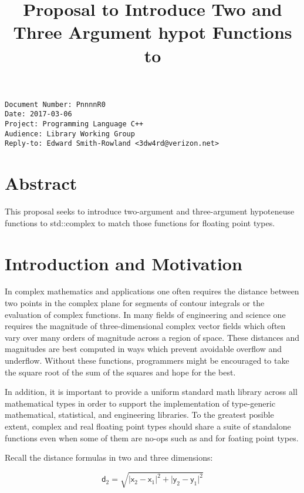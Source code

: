 \documentclass[ebook,10pt,oneside,openany,final]{memoir}
\title{Proposal to Introduce Two and Three Argument hypot Functions to \tcode{<complex>}}
\date{}
\begin{document}
\pagestyle{cpppage}

\maketitle

\begin{verbatim}
Document Number: PnnnnR0
Date: 2017-03-06
Project: Programming Language C++
Audience: Library Working Group
Reply-to: Edward Smith-Rowland <3dw4rd@verizon.net>
\end{verbatim}

\section{Abstract}

This proposal seeks to introduce two-argument and three-argument hypoteneuse functions
to std::complex to match those functions for floating point types.

\section{Introduction and Motivation}

In complex mathematics and applications one often requires the distance between two points in the complex plane
for segments of contour integrals or the evaluation of complex functions.  In many fields of engineering and science
one requires the magnitude of three-dimensional complex vector fields which often vary over many orders of magnitude across
a region of space.  These distances and magnitudes are best computed in ways which prevent avoidable overflow and underflow.
Without these functions, programmers might be encouraged to take the square root of the sum of the squares and hope
for the best.

In addition, it is important to provide a uniform standard math library across all mathematical types in order to support
the implementation of type-generic mathematical, statistical, and engineering libraries.  To the greatest posible extent,
complex and real floating point types should share a suite of standalone functions even when some of them are no-ops
such as  and  for foating point types.

Recall the distance formulas in two and three dimensions:

\[%
\mathsf{d}_2 = \sqrt{\lvert\mathsf{x}_2 - \mathsf{x}_1\rvert^2
                   + \lvert\mathsf{y}_2 - \mathsf{y}_1\rvert^2}
\]
\end{document}
